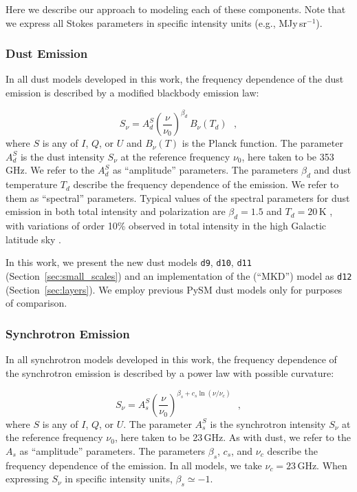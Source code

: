 \documentclass[twocolumn]{aastex631}
\begin{document}
Here we describe our approach to modeling each of these components. Note that we express all Stokes parameters in specific intensity units (e.g., MJy\,sr$^{-1}$).

\subsubsection{Dust Emission} \label{subsubsec:dust_model}
In all dust models developed in this work, the frequency dependence of the dust emission is described by a modified blackbody emission law:

\begin{equation} \label{eq:dust-emission-law}
    S_\nu = A_d^S \left(\frac{\nu}{\nu_0}\right)^{\beta_d} \, B_\nu(T_d)
    ~~~,
\end{equation}
where $S$ is any of $I$, $Q$, or $U$ and $B_\nu\left(T\right)$ is the Planck function. The parameter $A_d^S$ is the dust intensity $S_\nu$ at the reference frequency $\nu_0$, here taken to be 353\,GHz. We refer to the $A_d^S$ as ``amplitude'' parameters. The parameters $\beta_d$ and dust temperature $T_d$ describe the frequency dependence of the emission. We refer to them as ``spectral'' parameters. Typical values of the spectral parameters for dust emission in both total intensity and polarization are $\beta_d = 1.5$ and $T_d = 20$\,K \citep{planck2016-l11A}, with variations of order 10\% observed in total intensity in the high Galactic latitude sky \citep[e.g.,][]{planck2014-a12, planck2016-XLVIII}.

In this work, we present the new dust models \texttt{d9}, \texttt{d10}, \texttt{d11} (Section~\ref{sec:small_scales}) and an implementation of the \citet{Martinez-Solaeche:2018} (``MKD'') model as \texttt{d12} (Section~\ref{sec:layers}). We employ previous PySM dust models only for purposes of comparison.

\subsubsection{Synchrotron Emission} \label{subsubsec:synch_model}
In all synchrotron models developed in this work, the frequency dependence of the synchrotron emission is described by a power law with possible curvature:

\begin{equation} \label{eq:synch-emission-law}
    S_\nu = A_s^S \left(\frac{\nu}{\nu_0}\right)^{\beta_s + c_s \ln\left(\nu/\nu_c\right)}
    ~~~,
\end{equation}
where $S$ is any of $I$, $Q$, or $U$. The parameter $A_s^S$ is the synchrotron intensity $S_\nu$ at the reference frequency $\nu_0$, here taken to be 23\,GHz. As with dust, we refer to the $A_s$ as ``amplitude'' parameters. The parameters $\beta_s$, $c_s$, and $\nu_c$ describe the frequency dependence of the emission. In all models, we take $\nu_c = 23$\,GHz. When expressing $S_\nu$ in specific intensity units, $\beta_s \simeq -1$.
\end{document}
